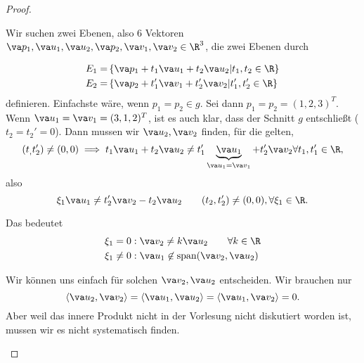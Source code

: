 \begin{proof}
	\begin{parts}
		\item  Wir suchen zwei Ebenen, also 6 Vektoren $\va p_1, \va u_1, \va u_2, \va p_2, \va v_1, \va v_2\in \R^3$, die zwei Ebenen durch
		
		\begin{align*}
			E_1=&\left\{ \va p_1+t_1\va u_1+t_2\va u_2|t_1,t_2\in \R \right\}\\
			E_2=&\left\{ \va p_2+t_1'\va v_1+t_2'\va v_2|t_1',t_2'\in \R \right\} 
		\end{align*}
		definieren. Einfachste wäre, wenn $p_1=p_2\in g$. Sei dann $p_1=p_2=(1,2,3)^T$. Wenn $\va u_1=\va v_1=(3,1,2)^T$, ist es auch klar, dass der Schnitt  $g$ entschließt ($t_2=t_2'=0$). Dann mussen wir $\va u_2, \va v_2$ finden, f\"{u}r die gelten, 
		\[(t_,t_2')\neq (0,0)\implies t_1\va u_1+t_2\va u_2\neq t_1' \underbrace{\va u_1}_{\va u_1=\va v_1}+t_2'\va v_2\forall t_1,t_1'\in \R,\]
		also
		\[
		\xi_1 \va u_1\neq t_2'\va v_2-t_2 \va u_2 \qquad (t_2,t_2')\neq (0,0), \forall \xi_1\in \R
		.\] 

		Das bedeutet
		\begin{align*}
			\xi_1=0&: \va v_2\neq k\va u_2 \qquad \forall k\in \R \\
			\xi_1\neq 0&: \va u_1\not\in \text{span}(\va v_2,\va u_2)
		\end{align*}
	
		\begin{Remark}
			Wir k\"{o}nnen uns einfach f\"{u}r solchen $\va v_2, \va u_2$ entscheiden. Wir brauchen nur
			\[
\left<\va u_2, \va v_2 \right> = \left<\va u_1, \va u_2 \right>	=\left<\va u_1, \va v_2 \right> =0		
			.\] 
			Aber weil das innere Produkt nicht in der Vorlesung nicht diskutiert worden ist, mussen wir es nicht systematisch finden.
		\end{Remark}


\end{parts}
\end{proof}
